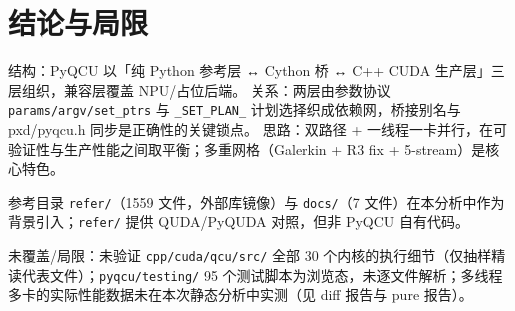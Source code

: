 \documentclass[UTF8]{ctexart}
\begin{document}
\section{结论与局限}

\begin{conclbox}
结构：PyQCU 以「纯 Python 参考层 ↔ Cython 桥 ↔ C++ CUDA 生产层」三层组织，兼容层覆盖 NPU/占位后端。
关系：两层由参数协议 \texttt{params/argv/set\_ptrs} 与 \texttt{\_SET\_PLAN\_} 计划选择织成依赖网，桥接别名与 pxd/pyqcu.h 同步是正确性的关键锁点。
思路：双路径 + 一线程一卡并行，在可验证性与生产性能之间取平衡；多重网格（Galerkin + R3 fix + 5-stream）是核心特色。
\end{conclbox}

\begin{refbox}
参考目录 \texttt{refer/}（1559 文件，外部库镜像）与 \texttt{docs/}（7 文件）在本分析中作为背景引入；\texttt{refer/} 提供 QUDA/PyQUDA 对照，但非 PyQCU 自有代码。
\end{refbox}

\begin{warnbox}
未覆盖/局限：\textcolor{warn}{未验证} \texttt{cpp/cuda/qcu/src/} 全部 30 个内核的执行细节（仅抽样精读代表文件）；\texttt{pyqcu/testing/} 95 个测试脚本为浏览态，未逐文件解析；多线程多卡的实际性能数据未在本次静态分析中实测（见 diff 报告与 pure 报告）。
\end{warnbox}
\end{document}
